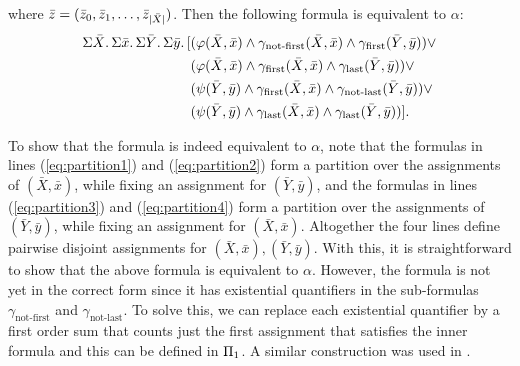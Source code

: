 where $\bar{z} = (\bar{z}_0,\bar{z}_1,\ldots,\bar{z}_{\vert \bar{X} \vert})$. Then the following formula is equivalent to $\alpha$:
\begin{align}
\Sigma{\bar{X}}.\,\Sigma{\bar{x}}.\,\Sigma{\bar{Y}}.\,\Sigma{\bar{y}}.\,[&(\varphi(\bar{X},\bar{x})\wedge\gamma_{\text{not-first}}(\bar{X},\bar{x})\wedge\gamma_{\text{first}}(\bar{Y},\bar{y}))\vee \label{eq:partition1} \\
&(\varphi(\bar{X},\bar{x})\wedge\gamma_{\text{first}}(\bar{X},\bar{x})\wedge\gamma_{\text{last}}(\bar{Y},\bar{y}))\vee \label{eq:partition2}\\
&(\psi(\bar{Y},\bar{y})\wedge\gamma_{\text{first}}(\bar{X},\bar{x})\wedge\gamma_{\text{not-last}}(\bar{Y},\bar{y}))\vee \label{eq:partition3}\\
&(\psi(\bar{Y},\bar{y})\wedge\gamma_{\text{last}}(\bar{X},\bar{x})\wedge\gamma_{\text{last}}(\bar{Y},\bar{y}))]. \label{eq:partition4}
\end{align}

To show that the formula is indeed equivalent to $\alpha$, note that the formulas in lines (\ref{eq:partition1}) and (\ref{eq:partition2}) form a partition over the assignments of $(\bar{X},\bar{x})$, while fixing an assignment for $(\bar{Y},\bar{y})$, and the formulas in lines (\ref{eq:partition3}) and (\ref{eq:partition4}) form a partition over the assignments of $(\bar{Y},\bar{y})$, while fixing an assignment for $(\bar{X},\bar{x})$. 
Altogether the four lines define pairwise disjoint assignments for $(\bar{X},\bar{x}),(\bar{Y},\bar{y})$. 
With this, it is straightforward to show that the above formula is equivalent to $\alpha$. 
However, the formula is not yet in the correct form since it has existential quantifiers in the sub-formulas $\gamma_{\text{not-first}}$ and $\gamma_{\text{not-last}}$. 
To solve this, we can replace each existential quantifier by a first order sum that counts just the first assignment that satisfies the inner formula and this can be defined in $\Pi_{1}$. 
A similar construction was used in \cite{SalujaST95}. 

